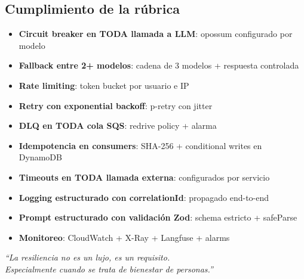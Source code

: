 \documentclass[11pt,a4paper]{article}
\begin{document}
\subsection{Cumplimiento de la r\'ubrica}

\begin{itemize}[leftmargin=*]
    \item \textbf{Circuit breaker en TODA llamada a LLM}: opossum configurado por modelo
    \item \textbf{Fallback entre 2+ modelos}: cadena de 3 modelos + respuesta controlada
    \item \textbf{Rate limiting}: token bucket por usuario e IP
    \item \textbf{Retry con exponential backoff}: p-retry con jitter
    \item \textbf{DLQ en TODA cola SQS}: redrive policy + alarma
    \item \textbf{Idempotencia en consumers}: SHA-256 + conditional writes en DynamoDB
    \item \textbf{Timeouts en TODA llamada externa}: configurados por servicio
    \item \textbf{Logging estructurado con correlationId}: propagado end-to-end
    \item \textbf{Prompt estructurado con validaci\'on Zod}: schema estricto + safeParse
    \item \textbf{Monitoreo}: CloudWatch + X-Ray + Langfuse + alarms
\end{itemize}

\vspace{0.5cm}

\begin{center}
\textit{``La resiliencia no es un lujo, es un requisito.\\Especialmente cuando se trata de bienestar de personas.''}
\end{center}
\end{document}
